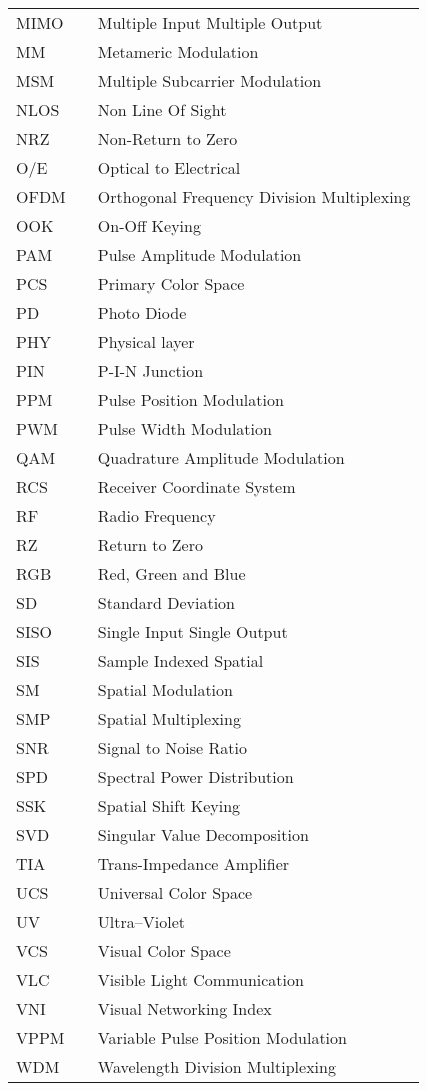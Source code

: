 \begin{center}
\begin{longtable}{lll}
		MIMO & \dotfill & Multiple Input Multiple Output \\
		MM & \dotfill & Metameric Modulation \\
		MSM & \dotfill & Multiple Subcarrier Modulation \\
		NLOS & \dotfill & Non Line Of Sight \\
		NRZ & \dotfill & Non-Return to Zero \\
		O/E & \dotfill & Optical to Electrical \\
		OFDM  & \dotfill & Orthogonal Frequency Division Multiplexing \\
		OOK & \dotfill & On-Off Keying \\
		PAM & \dotfill & Pulse Amplitude Modulation \\
		PCS & \dotfill & Primary Color Space \\
		PD & \dotfill & Photo Diode \\
		PHY & \dotfill & Physical layer \\
		PIN & \dotfill & P-I-N Junction \\
		PPM & \dotfill & Pulse Position Modulation \\
		PWM & \dotfill & Pulse Width Modulation \\
		QAM & \dotfill & Quadrature Amplitude Modulation \\
		RCS & \dotfill & Receiver Coordinate System \\
    RF  & \dotfill & Radio Frequency \\
		RZ & \dotfill & Return to Zero \\
		RGB & \dotfill & Red, Green and Blue \\
		SD & \dotfill & Standard Deviation \\
		SISO & \dotfill & Single Input Single Output \\
		SIS & \dotfill & Sample Indexed Spatial \\
		SM & \dotfill & Spatial Modulation \\
		SMP & \dotfill & Spatial Multiplexing \\
		SNR & \dotfill & Signal to Noise Ratio \\
		SPD & \dotfill & Spectral Power Distribution \\
		SSK & \dotfill & Spatial Shift Keying \\
		SVD & \dotfill & Singular Value Decomposition \\
		TIA & \dotfill & Trans-Impedance Amplifier \\
		UCS & \dotfill & Universal Color Space \\
		UV & \dotfill & Ultra--Violet \\
		VCS & \dotfill & Visual Color Space \\
    VLC  & \dotfill & Visible Light Communication \\
		VNI & \dotfill & Visual Networking Index \\
		VPPM & \dotfill & Variable Pulse Position Modulation \\
		WDM & \dotfill & Wavelength Division Multiplexing \\
  \end{longtable}
\end{center}